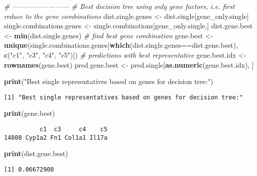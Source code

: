 \documentclass[]{article}
\newenvironment{Shaded}{\begin{snugshade}}{\end{snugshade}}
\newcommand{\KeywordTok}[1]{\textcolor[rgb]{0.13,0.29,0.53}{\textbf{{#1}}}}
\newcommand{\StringTok}[1]{\textcolor[rgb]{0.31,0.60,0.02}{{#1}}}
\newcommand{\CommentTok}[1]{\textcolor[rgb]{0.56,0.35,0.01}{\textit{{#1}}}}
\newcommand{\NormalTok}[1]{{#1}}
\begin{document}
\begin{Shaded}
\begin{Highlighting}[]
\CommentTok{# ------------------------}
\CommentTok{# Best decision tree using only gene factors, i.e. first reduce to the gene combinations}
\NormalTok{dist.single.genes <-}\StringTok{ }\NormalTok{dist.single[gene_only.single]}
\NormalTok{single.combinations.genes <-}\StringTok{ }\NormalTok{single.combinations[gene_only.single,]}
\NormalTok{dist.gene.best <-}\StringTok{ }\KeywordTok{min}\NormalTok{(dist.single.genes)}
\CommentTok{# find best gene combination}
\NormalTok{gene.best <-}\StringTok{ }\KeywordTok{unique}\NormalTok{(single.combinations.genes[}\KeywordTok{which}\NormalTok{(dist.single.genes==dist.gene.best), }
                                              \KeywordTok{c}\NormalTok{(}\StringTok{"c1"}\NormalTok{, }\StringTok{"c3"}\NormalTok{, }\StringTok{"c4"}\NormalTok{, }\StringTok{"c5"}\NormalTok{)])}
\CommentTok{# predictions with best representative}
\NormalTok{gene.best.idx <-}\StringTok{ }\KeywordTok{rownames}\NormalTok{(gene.best)}
\NormalTok{pred.gene.best <-}\StringTok{ }\NormalTok{pred.single[}\KeywordTok{as.numeric}\NormalTok{(gene.best.idx), ]}

\KeywordTok{print}\NormalTok{(}\StringTok{"Best single representatives based on genes for decision tree:"}\NormalTok{)}
\end{Highlighting}
\end{Shaded}

\begin{verbatim}
[1] "Best single representatives based on genes for decision tree:"
\end{verbatim}

\begin{Shaded}
\begin{Highlighting}[]
\KeywordTok{print}\NormalTok{(gene.best)}
\end{Highlighting}
\end{Shaded}

\begin{verbatim}
          c1  c3     c4    c5
14808 Cyp1a2 Fn1 Col1a1 Il17a
\end{verbatim}

\begin{Shaded}
\begin{Highlighting}[]
\KeywordTok{print}\NormalTok{(dist.gene.best)}
\end{Highlighting}
\end{Shaded}

\begin{verbatim}
[1] 0.06672908
\end{verbatim}
\end{document}
